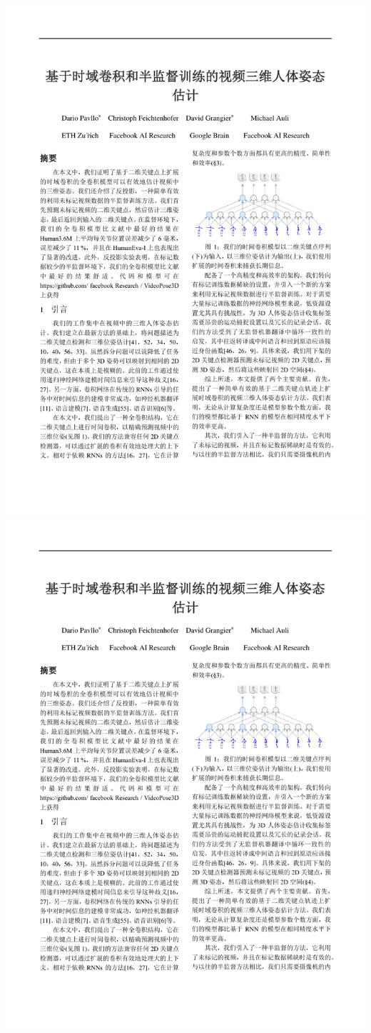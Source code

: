 \includegraphics[width=\textwidth, page=4, trim=28mm 30mm 28mm 32mm]{appendix/translate.pdf}
\includegraphics[width=\textwidth, page=5, trim=28mm 30mm 28mm 32mm]{appendix/translate.pdf}

